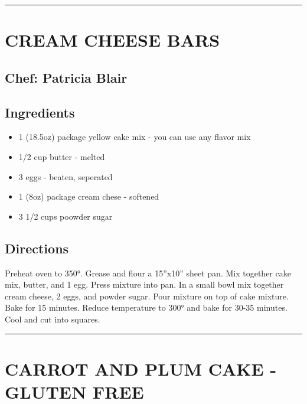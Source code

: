\documentclass[
]{book}
\providecommand{\tightlist}{%
  \setlength{\itemsep}{0pt}\setlength{\parskip}{0pt}}
\begin{document}
\begin{center}\rule{0.5\linewidth}{0.5pt}\end{center}

\hypertarget{cream-cheese-bars}{%
\section*{CREAM CHEESE BARS}\label{cream-cheese-bars}}


\hypertarget{chef-patricia-blair-14}{%
\subsection*{Chef: Patricia Blair}\label{chef-patricia-blair-14}}


\hypertarget{ingredients-82}{%
\subsection*{Ingredients}\label{ingredients-82}}


\begin{itemize}
\tightlist
\item
  1 (18.5oz) package yellow cake mix - you can use any flavor mix
\item
  1/2 cup butter - melted
\item
  3 eggs - beaten, seperated
\item
  1 (8oz) package cream chese - softened
\item
  3 1/2 cups poowder sugar
\end{itemize}

\hypertarget{directions-82}{%
\subsection*{Directions}\label{directions-82}}


Preheat oven to 350°. Grease and flour a 15''x10'' sheet pan. Mix together cake mix, butter, and 1 egg. Press mixture into pan. In a small bowl mix together cream cheese, 2 eggs, and powder sugar. Pour mixture on top of cake mixture. Bake for 15 minutes. Reduce temperature to 300° and bake for 30-35 minutes. Cool and cut into squares.

\begin{center}\rule{0.5\linewidth}{0.5pt}\end{center}

\hypertarget{carrot-and-plum-cake---gluten-free}{%
\section*{CARROT AND PLUM CAKE - GLUTEN FREE}\label{carrot-and-plum-cake---gluten-free}}
\end{document}
